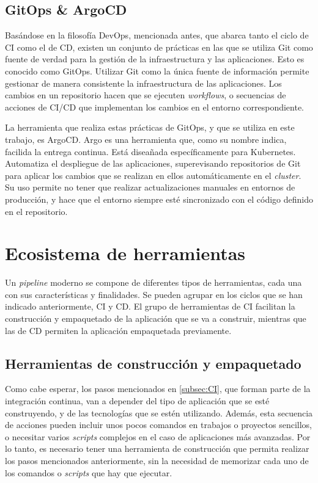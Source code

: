 \subsection*{GitOps \& ArgoCD}

Basándose en la filosofía DevOps, mencionada antes, que abarca tanto el ciclo de CI como el de CD, existen un conjunto de prácticas en las que se utiliza Git como fuente de verdad para la gestión de la infraestructura y las aplicaciones. Esto es conocido como GitOps. Utilizar Git como la única fuente de información permite gestionar de manera consistente la infraestructura de las aplicaciones. Los cambios en un repositorio hacen que se ejecuten \textit{workflows}, o secuencias de acciones de CI/CD que implementan los cambios en el entorno correspondiente.

La herramienta que realiza estas prácticas de GitOps, y que se utiliza en este trabajo, es ArgoCD. Argo es una herramienta que, como su nombre indica, facilida la entrega continua. Está diseañada específicamente para Kubernetes. Automatiza el despliegue de las aplicaciones, superevisando repositorios de Git para aplicar los cambios que se realizan en ellos automáticamente en el \textit{cluster}. Su uso permite no tener que realizar actualizaciones manuales en entornos de producción, y hace que el entorno siempre esté sincronizado con el código definido en el repositorio.

\section{Ecosistema de herramientas}

Un \textit{pipeline} moderno se compone de diferentes tipos de herramientas, cada una con sus características y finalidades. Se pueden agrupar en los ciclos que se han indicado anteriormente, CI y CD. El grupo de herramientas de CI facilitan la construcción y empaquetado de la aplicación que se va a construir, mientras que las de CD permiten la aplicación empaquetada previamente.

\subsection*{Herramientas de construcción y empaquetado}

Como cabe esperar, los pasos mencionados en \ref{subsec:CI}, que forman parte de la integración continua, van a depender del tipo de aplicación que se esté construyendo, y de las tecnologías que se estén utilizando. Además, esta secuencia de acciones pueden incluir unos pocos comandos en trabajos o proyectos sencillos, o necesitar varios \textit{scripts} complejos en el caso de aplicaciones más avanzadas. Por lo tanto, es necesario tener una herramienta de construcción que permita realizar los pasos mencionados anteriormente, sin la necesidad de memorizar cada uno de los comandos o \textit{scripts} que hay que ejecutar.

